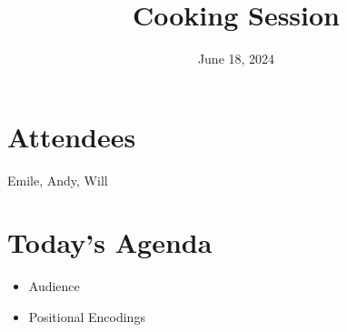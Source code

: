 \documentclass{article}
\title{Cooking Session}
\date{June 18, 2024}
\begin{document}
\maketitle

\section{Attendees}

Emile, Andy, Will

\section{Today's Agenda}
\begin{itemize}
    \item Audience
    \item Positional Encodings
\end{itemize}
\end{document}
